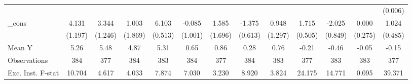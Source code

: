 {\begin{tabular}{l*{12}{c}}
            &                     &                     &                     &                     &                     &                     &                     &                     &                     &                     &                     &     (0.006)         \\
\addlinespace
\_cons      &       4.131\sym{***}&       3.344\sym{**} &       1.003         &       6.103\sym{***}&      -0.085         &       1.585         &      -1.375\sym{**} &       0.948         &       1.715\sym{***}&      -2.025\sym{**} &       0.000         &       1.024\sym{**} \\
            &     (1.197)         &     (1.246)         &     (1.869)         &     (0.513)         &     (1.001)         &     (1.696)         &     (0.613)         &     (1.297)         &     (0.505)         &     (0.849)         &     (0.275)         &     (0.485)         \\
\midrule
Mean Y      &        5.26         &        5.48         &        4.87         &        5.31         &        0.65         &        0.86         &        0.28         &        0.76         &       -0.21         &       -0.46         &       -0.05         &       -0.15         \\
Observations&         384         &         377         &         384         &         383         &         384         &         377         &         384         &         383         &         377         &         383         &         383         &         377         \\
Exc. Inst. F-stat&      10.704         &       4.617         &       4.033         &       7.874         &       7.030         &       3.230         &       8.920         &       3.824         &      24.175         &      14.771         &       0.095         &      39.371         \\
\bottomrule
\end{tabular}
}
